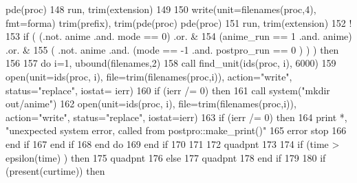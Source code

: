 \begin{DoxyCode}
{      pde(proc)%
148 \textcolor{comment}{                                             run,  trim(extension)}
149 \textcolor{comment}{}
150 \textcolor{comment}{        }\textcolor{keyword}{write}(unit=filenames(proc,4), fmt=forma) trim(prefix), trim(pde(proc)%
      pde(proc)%
151 \textcolor{comment}{                                                  run,  trim(extension)}
152 \textcolor{comment}{!       }
153         \textcolor{keywordflow}{if} ( (.not. anime .and. mode == 0)  .or. &
154           (anime\_run == 1 .and. anime) .or. & 
155          ( .not. anime .and. (mode == -1 .and. postpro_run == 0 ) ) ) \textcolor{keywordflow}{then}
156 
157           \textcolor{keywordflow}{do} i=1, ubound(filenames,2)
158             \textcolor{keyword}{call }find_unit(ids(proc, i), 6000)
159             \textcolor{keyword}{open}(unit=ids(proc, i), file=trim(filenames(proc,i)), action=\textcolor{stringliteral}{"write"}\textcolor{comment}{, status=}\textcolor{stringliteral}{"replace"}\textcolor{comment}{, iostat=
      ierr)}
160 \textcolor{comment}{            }\textcolor{keywordflow}{if} (ierr /= 0) \textcolor{keywordflow}{then}
161               \textcolor{keyword}{call }system(\textcolor{stringliteral}{"mkdir out/anime"})
162               \textcolor{keyword}{open}(unit=ids(proc, i), file=trim(filenames(proc,i)), action=\textcolor{stringliteral}{"write"}\textcolor{comment}{, status=}\textcolor{stringliteral}{"replace"}\textcolor{comment}{, 
      iostat=ierr)}
163 \textcolor{comment}{              }\textcolor{keywordflow}{if} (ierr /= 0) \textcolor{keywordflow}{then}
164                 print *, \textcolor{stringliteral}{"unexpected system error, called from postpro::make\_print()"}
165                 error stop
166 \textcolor{keywordflow}{              end if}
167 \textcolor{keywordflow}{            end if}
168 \textcolor{keywordflow}{          end do}  
169 \textcolor{keywordflow}{        end if}
170 
171 
172         quadpnt%
173         
174         \textcolor{keywordflow}{if} (time > epsilon(time) ) \textcolor{keywordflow}{then}
175           quadpnt%
176         \textcolor{keywordflow}{else}
177           quadpnt%
178 \textcolor{keywordflow}{        end if}
179         
180         \textcolor{keywordflow}{if} (\textcolor{keyword}{present}(curtime)) \textcolor{keywordflow}{then}
}
\end{DoxyCode}
